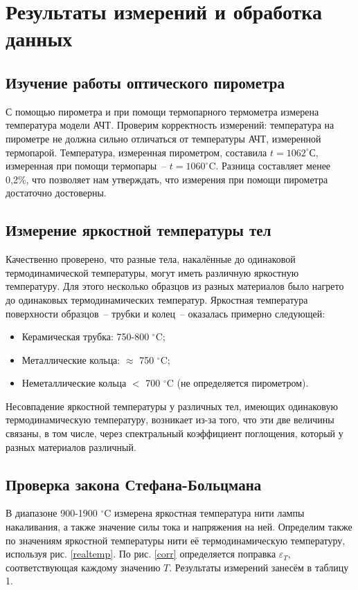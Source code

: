 \section{Результаты измерений и обработка данных}

\subsection{Изучение работы оптического пирометра}

С помощью пирометра и при помощи термопарного термометра измерена температура модели АЧТ. Проверим корректность измерений: температура на пирометре не должна сильно отличаться от температуры АЧТ, измеренной термопарой. Температура, измеренная пирометром, составила $t = 1062^{\circ}$С, измеренная при помощи термопары~-- $t = 1060^\circ$C. Разница составляет менее 0,2\%, что позволяет нам утверждать, что измерения при помощи пирометра достаточно достоверны. 

\subsection{Измерение яркостной температуры тел}
Качественно проверено, что разные тела, накалённые до одинаковой термодинамической температуры, могут иметь различную яркостную температуру. Для этого несколько образцов из разных материалов было нагрето до одинаковых термодинамических температур. Яркостная температура поверхности образцов~-- трубки и колец~-- оказалась примерно следующей:
    \begin{itemize}
        \item Керамическая трубка: 750-800 $^{\circ}$C;
        \item Металлические кольца: $\approx$ 750 $^{\circ}$C; 
        \item Неметаллические кольца $<$ 700 $^{\circ}$C (не определяется пирометром).
    \end{itemize}
Несовпадение яркостной температуры у различных тел, имеющих одинаковую термодинамическую температуру, возникает из-за того, что эти две величины связаны, в том числе, через спектральный коэффициент поглощения, который у разных материалов различный.    

\subsection{Проверка закона Стефана-Больцмана}
В диапазоне 900-1900 $^\circ$C измерена яркостная температура нити лампы накаливания, а также значение силы тока и напряжения на ней. Определим также по значениям яркостной температуры нити её термодинамическую температуру, используя рис. \ref{realtemp}. По рис. \ref{corr} определяется поправка $\varepsilon_T$, соответствующая каждому значению $T$. Результаты измерений занесём в таблицу 1.
    
